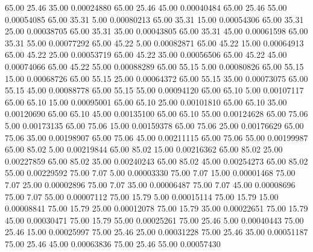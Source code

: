      65.00     25.46     35.00     0.00024880
     65.00     25.46     45.00     0.00040484
     65.00     25.46     55.00     0.00054085
     65.00     35.31      5.00     0.00080213
     65.00     35.31     15.00     0.00054306
     65.00     35.31     25.00     0.00038705
     65.00     35.31     35.00     0.00043805
     65.00     35.31     45.00     0.00061598
     65.00     35.31     55.00     0.00077292
     65.00     45.22      5.00     0.00082871
     65.00     45.22     15.00     0.00064913
     65.00     45.22     25.00     0.00053719
     65.00     45.22     35.00     0.00056506
     65.00     45.22     45.00     0.00074066
     65.00     45.22     55.00     0.00088289
     65.00     55.15      5.00     0.00080826
     65.00     55.15     15.00     0.00068726
     65.00     55.15     25.00     0.00064372
     65.00     55.15     35.00     0.00073075
     65.00     55.15     45.00     0.00088778
     65.00     55.15     55.00     0.00094120
     65.00     65.10      5.00     0.00107117
     65.00     65.10     15.00     0.00095001
     65.00     65.10     25.00     0.00101810
     65.00     65.10     35.00     0.00120690
     65.00     65.10     45.00     0.00135100
     65.00     65.10     55.00     0.00124628
     65.00     75.06      5.00     0.00173135
     65.00     75.06     15.00     0.00159378
     65.00     75.06     25.00     0.00176629
     65.00     75.06     35.00     0.00198907
     65.00     75.06     45.00     0.00211115
     65.00     75.06     55.00     0.00199987
     65.00     85.02      5.00     0.00219844
     65.00     85.02     15.00     0.00216362
     65.00     85.02     25.00     0.00227859
     65.00     85.02     35.00     0.00240243
     65.00     85.02     45.00     0.00254273
     65.00     85.02     55.00     0.00229592
     75.00      7.07      5.00     0.00003330
     75.00      7.07     15.00     0.00001468
     75.00      7.07     25.00     0.00002896
     75.00      7.07     35.00     0.00006487
     75.00      7.07     45.00     0.00008696
     75.00      7.07     55.00     0.00007112
     75.00     15.79      5.00     0.00015114
     75.00     15.79     15.00     0.00008841
     75.00     15.79     25.00     0.00012078
     75.00     15.79     35.00     0.00022651
     75.00     15.79     45.00     0.00030471
     75.00     15.79     55.00     0.00025261
     75.00     25.46      5.00     0.00040443
     75.00     25.46     15.00     0.00025997
     75.00     25.46     25.00     0.00031228
     75.00     25.46     35.00     0.00051187
     75.00     25.46     45.00     0.00063836
     75.00     25.46     55.00     0.00057430
